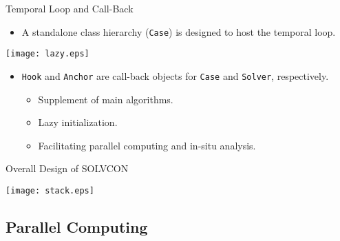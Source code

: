 \documentclass[dvips,xcolor=pst,14pt]{beamer}
\begin{document}
\begin{frame}{
%
Temporal Loop and Call-Back
%
}
\begin{itemize}
  \item A standalone class hierarchy (\texttt{Case}) is designed to host the
  \alert{temporal loop}.
\end{itemize}
\begin{center}
  \parbox{\textwidth}{\centering
  \texttt{[image: lazy.eps]}}
\end{center}
\begin{itemize}
  \item \texttt{Hook} and \texttt{Anchor} are call-back objects for
  \texttt{Case} and \texttt{Solver}, respectively.
  \begin{itemize}
    \item Supplement of main algorithms.
    \item Lazy initialization.
    \item Facilitating parallel computing and in-situ analysis.
  \end{itemize}
\end{itemize}
\end{frame}

\begin{frame}{
%
Overall Design of SOLVCON
%
}
\begin{center}
  \parbox{\textwidth}{\centering
  \texttt{[image: stack.eps]}}
\end{center}
\end{frame}

\subsection{
Parallel Computing
}
\end{document}
